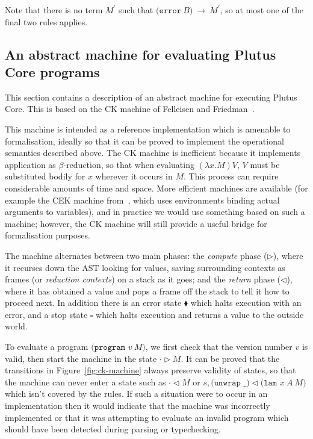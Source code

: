 \documentclass[a4paper]{article}
\newcommand{\keyword}[1]{\texttt{#1}}
\newcommand{\construct}[1]{\texttt{(} #1 \texttt{)}}
\newcommand{\error}[1]{\construct{\keyword{error} ~ #1}}
\newcommand{\step}[2]{#1 ~ \rightarrow ~ #2}
\begin{document}


\noindent Note that there is no term $M^{\prime}$ such that
$\step{\error{B}}{M^{\prime}}$, so at most one of the final two rules
applies.

\subsection{An abstract machine for evaluating Plutus Core programs}
This section contains a description of an abstract machine for
executing Plutus Core.  This is based on the CK machine of Felleisen
and Friedman~\citep{Felleisen-CK-CEK}.

This machine is intended as a reference implementation which is
amenable to formalisation, ideally so that it can be proved to
implement the operational semantics described above.  The CK machine
is inefficient because it implements application as $\beta$-reduction,
so that when evaluating $(\lambda x.M)V$, $V$ must be substituted
bodily for $x$ wherever it occurs in $M$.  This process can require
considerable amounts of time and space.  More efficient machines are
available (for example the CEK machine from~\citep{Felleisen-CK-CEK},
which uses environments binding actual arguments to variables), and in
practice we would use something based on such a machine; however, the
CK machine will still provide a useful bridge for formalisation
purposes.



\noindent The machine alternates between two main phases: the
\textit{compute} phase ($\triangleright$), where it recurses down
the AST looking for values, saving surrounding contexts as frames (or
\textit{reduction contexts}) on a stack as it goes; and the
\textit{return} phase ($\triangleleft$), where it has obtained a value and
pops a frame off the stack to tell it how to proceed next.  In
addition there is an error state $\blacklozenge$ which halts execution
with an error, and a stop state $\square$ which halts execution and
returns a value to the outside world.

To evaluate a program $\texttt{(program } v\ M \texttt{)}$, we first
check that the version number $v$ is valid, then start the machine in
the state $\cdot \triangleright M$.  It can be proved that the
transitions in Figure~\ref{fig:ck-machine} always preserve
validity of states, so that the machine can never enter a state such as
  $\cdot \triangleleft M$
or
$s, \texttt{(unwrap \_)} \triangleleft \texttt{(lam }x\ A \ M\texttt{)}$
which isn't covered by the rules.  If such a
situation were to occur in an implementation then it would indicate
that the machine was incorrectly implemented or that it was attempting
to evaluate an invalid program which should have been detected during
parsing or typechecking.
\end{document}
